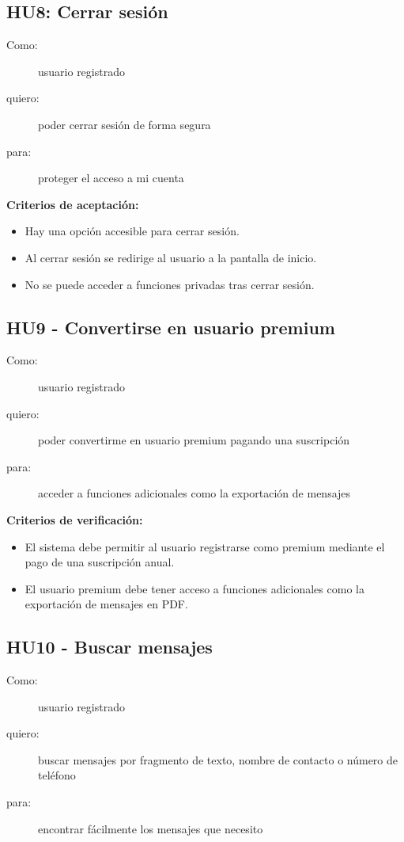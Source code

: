 \subsection*{HU8: Cerrar sesión}
\begin{description}
  \item[Como:] usuario registrado
  \item[quiero:] poder cerrar sesión de forma segura
  \item[para:] proteger el acceso a mi cuenta
\end{description}

\textbf{Criterios de aceptación:}
\begin{itemize}
    \item Hay una opción accesible para cerrar sesión.
    \item Al cerrar sesión se redirige al usuario a la pantalla de inicio.
    \item No se puede acceder a funciones privadas tras cerrar sesión.
\end{itemize}

\subsection*{HU9 - Convertirse en usuario premium}
\begin{description}
    \item[Como:]usuario registrado
    \item[quiero:] poder convertirme en usuario premium pagando una suscripción
    \item[para:] acceder a funciones adicionales como la exportación de mensajes
\end{description}

\textbf{Criterios de verificación:}
\begin{itemize}
    \item El sistema debe permitir al usuario registrarse como premium mediante el pago de una suscripción anual.
    \item El usuario premium debe tener acceso a funciones adicionales como la exportación de mensajes en PDF.
\end{itemize}

\subsection*{HU10 - Buscar mensajes}
\begin{description}
    \item[Como:] usuario registrado
    \item[quiero:] buscar mensajes por fragmento de texto, nombre de contacto o número de teléfono
    \item[para:] encontrar fácilmente los mensajes que necesito
\end{description}

